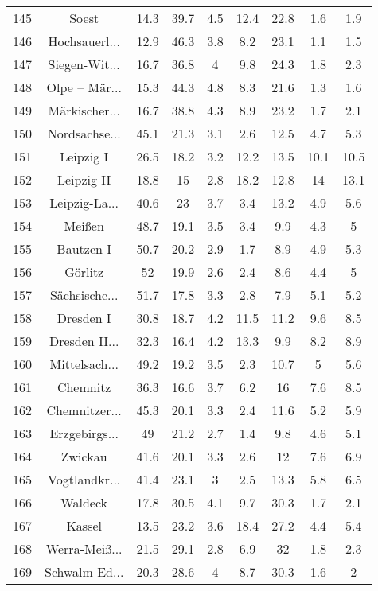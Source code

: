 \begin{table}[!htbp]
\begin{tabular}{@{\extracolsep{5pt}} ccccccccc}
145 & Soest & 14.3 & 39.7 & 4.5 & 12.4 & 22.8 & 1.6 & 1.9 \\ 
146 & Hochsauerl... & 12.9 & 46.3 & 3.8 & 8.2 & 23.1 & 1.1 & 1.5 \\ 
147 & Siegen-Wit... & 16.7 & 36.8 & 4 & 9.8 & 24.3 & 1.8 & 2.3 \\ 
148 & Olpe – Mär... & 15.3 & 44.3 & 4.8 & 8.3 & 21.6 & 1.3 & 1.6 \\ 
149 & Märkischer... & 16.7 & 38.8 & 4.3 & 8.9 & 23.2 & 1.7 & 2.1 \\ 
150 & Nordsachse... & 45.1 & 21.3 & 3.1 & 2.6 & 12.5 & 4.7 & 5.3 \\ 
151 & Leipzig I & 26.5 & 18.2 & 3.2 & 12.2 & 13.5 & 10.1 & 10.5 \\ 
152 & Leipzig II & 18.8 & 15 & 2.8 & 18.2 & 12.8 & 14 & 13.1 \\ 
153 & Leipzig-La... & 40.6 & 23 & 3.7 & 3.4 & 13.2 & 4.9 & 5.6 \\ 
154 & Meißen & 48.7 & 19.1 & 3.5 & 3.4 & 9.9 & 4.3 & 5 \\ 
155 & Bautzen I & 50.7 & 20.2 & 2.9 & 1.7 & 8.9 & 4.9 & 5.3 \\ 
156 & Görlitz & 52 & 19.9 & 2.6 & 2.4 & 8.6 & 4.4 & 5 \\ 
157 & Sächsische... & 51.7 & 17.8 & 3.3 & 2.8 & 7.9 & 5.1 & 5.2 \\ 
158 & Dresden I & 30.8 & 18.7 & 4.2 & 11.5 & 11.2 & 9.6 & 8.5 \\ 
159 & Dresden II... & 32.3 & 16.4 & 4.2 & 13.3 & 9.9 & 8.2 & 8.9 \\ 
160 & Mittelsach... & 49.2 & 19.2 & 3.5 & 2.3 & 10.7 & 5 & 5.6 \\ 
161 & Chemnitz & 36.3 & 16.6 & 3.7 & 6.2 & 16 & 7.6 & 8.5 \\ 
162 & Chemnitzer... & 45.3 & 20.1 & 3.3 & 2.4 & 11.6 & 5.2 & 5.9 \\ 
163 & Erzgebirgs... & 49 & 21.2 & 2.7 & 1.4 & 9.8 & 4.6 & 5.1 \\ 
164 & Zwickau & 41.6 & 20.1 & 3.3 & 2.6 & 12 & 7.6 & 6.9 \\ 
165 & Vogtlandkr... & 41.4 & 23.1 & 3 & 2.5 & 13.3 & 5.8 & 6.5 \\ 
166 & Waldeck & 17.8 & 30.5 & 4.1 & 9.7 & 30.3 & 1.7 & 2.1 \\ 
167 & Kassel & 13.5 & 23.2 & 3.6 & 18.4 & 27.2 & 4.4 & 5.4 \\ 
168 & Werra-Meiß... & 21.5 & 29.1 & 2.8 & 6.9 & 32 & 1.8 & 2.3 \\ 
169 & Schwalm-Ed... & 20.3 & 28.6 & 4 & 8.7 & 30.3 & 1.6 & 2 \\ 

\end{tabular}
\end{table}
